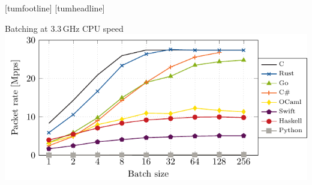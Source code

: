 \documentclass[NET,english,aspectratio=43,notitleframe]{tumbeamer}
\begin{document}

\begin{frame}{}
\vspace{-.75cm}
\centering
\end{frame}
[tumfootline]
[tumheadline]



\begin{frame}{Batching at 3.3\,GHz CPU speed}
\centering\includegraphics[scale=1]{figures/batches-33.pdf}
\end{frame}

%
\end{document}
